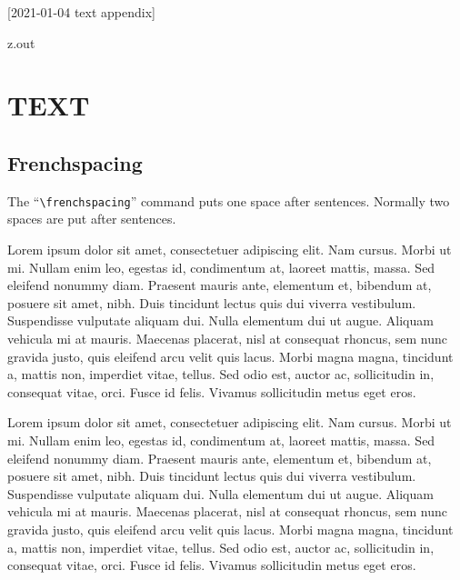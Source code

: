[2021-01-04 text appendix]

\begin{VerbatimOut}{z.out}
\chapter{TEXT}


\section{Frenchspacing}

The ``\verb+\frenchspacing+'' command puts one space after sentences.
Normally two spaces are put after sentences.

{\frenchspacing
Lorem ipsum dolor sit amet, consectetuer adipiscing elit. Nam
cursus. Morbi ut mi. Nullam enim leo, egestas id, condimentum at,
laoreet mattis, massa. Sed eleifend nonummy diam. Praesent mauris
ante, elementum et, bibendum at, posuere sit amet, nibh. Duis
tincidunt lectus quis dui viverra vestibulum. Suspendisse
vulputate aliquam dui. Nulla elementum dui ut augue. Aliquam
vehicula mi at mauris. Maecenas placerat, nisl at consequat
rhoncus, sem nunc gravida justo, quis eleifend arcu velit quis
lacus. Morbi magna magna, tincidunt a, mattis non, imperdiet
vitae, tellus. Sed odio est, auctor ac, sollicitudin in,
consequat vitae, orci. Fusce id felis. Vivamus sollicitudin metus
eget eros.\endgraf
}

Lorem ipsum dolor sit amet, consectetuer adipiscing elit. Nam
cursus. Morbi ut mi. Nullam enim leo, egestas id, condimentum at,
laoreet mattis, massa. Sed eleifend nonummy diam. Praesent mauris
ante, elementum et, bibendum at, posuere sit amet, nibh. Duis
tincidunt lectus quis dui viverra vestibulum. Suspendisse
vulputate aliquam dui. Nulla elementum dui ut augue. Aliquam
vehicula mi at mauris. Maecenas placerat, nisl at consequat
rhoncus, sem nunc gravida justo, quis eleifend arcu velit quis
lacus. Morbi magna magna, tincidunt a, mattis non, imperdiet
vitae, tellus. Sed odio est, auctor ac, sollicitudin in,
consequat vitae, orci. Fusce id felis. Vivamus sollicitudin metus
eget eros.
\end{VerbatimOut}

\MyIOS


